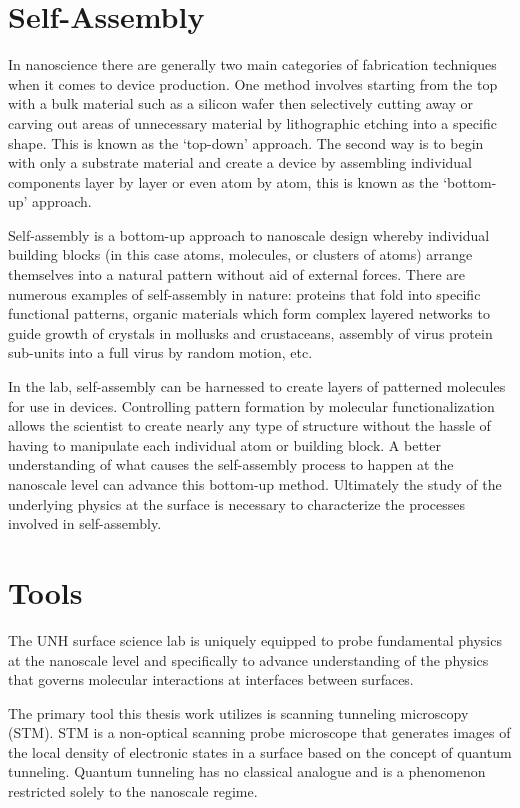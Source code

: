 \section{Self-Assembly}
In nanoscience there are generally two main categories of fabrication techniques when it comes to device production. One method involves starting from the top with a bulk material such as a silicon wafer then selectively cutting away or carving out areas of unnecessary material by lithographic etching into a specific shape. This is known as the `top-down' approach. The second way is to begin with only a substrate material and create a device by assembling individual components layer by layer or even atom by atom, this is known as the `bottom-up' approach.

Self-assembly is a bottom-up approach to nanoscale design whereby individual building blocks (in this case atoms, molecules, or clusters of atoms) arrange themselves into a natural pattern without aid of external forces. There are numerous examples of self-assembly in nature: proteins that fold into specific functional patterns, organic materials which form complex layered networks to guide growth of crystals in mollusks and crustaceans, assembly of virus protein sub-units into a full virus by random motion, etc.

In the lab, self-assembly can be harnessed to create layers of patterned molecules for use in devices. Controlling pattern formation by molecular functionalization allows the scientist to create nearly any type of structure without the hassle of having to manipulate each individual atom or building block. A better understanding of what causes the self-assembly process to happen at the nanoscale level can advance this bottom-up method. Ultimately the study of the underlying physics at the surface is necessary to characterize the processes involved in self-assembly.

\section{Tools}
The UNH surface science lab is uniquely equipped to probe fundamental physics at the nanoscale level and specifically to advance understanding of the physics that governs molecular interactions at interfaces between surfaces.

The primary tool this thesis work utilizes is scanning tunneling microscopy (STM). STM is a non-optical scanning probe microscope that generates images of the local density of electronic states in a surface based on the concept of quantum tunneling. Quantum tunneling has no classical analogue and is a phenomenon restricted solely to the nanoscale regime.

